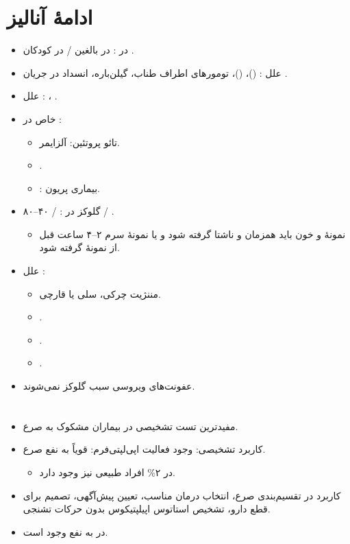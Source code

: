 \documentclass[a4paper,12pt]{extbook}
\begin{document}
\section*{ادامهٔ آنالیز }
\begin{itemize}
\item {} در : در بالغین  / در کودکان .
\item علل :  ()،  ()، تومورهای اطراف طناب، گیلن‌باره، انسداد در جریان .
\item علل : ، .
\item {} خاص در :
  \begin{itemize}
  \item تائو پروتئین: آلزایمر.
  \item {}.
  \item {}: بیماری پریون.
  \end{itemize}
\item گلوکز در :  / ۴۰–۸۰ / .
  \begin{itemize}
  \item نمونهٔ  و خون باید همزمان و ناشتا گرفته شود و یا نمونهٔ سرم ۲–۴ ساعت قبل از نمونهٔ  گرفته شود.
  \end{itemize}
\item علل :
  \begin{itemize}
  \item مننژیت چرکی، سلی یا قارچی.
  \item {}.
  \item {}.
  \item {}.
  \end{itemize}
\item عفونت‌های ویروسی سبب \PCmath{\downarrow} گلوکز نمی‌شوند.
\end{itemize}

\section*{}
\begin{itemize}
\item مفیدترین تست تشخیصی در بیماران مشکوک به صرع.
\item کاربرد تشخیصی: وجود فعالیت اپی‌لپتی‌فرم: قویاً به نفع صرع.
  \begin{itemize}
  \item در ۲\% افراد طبیعی نیز وجود دارد.
  \end{itemize}
\item کاربرد در تقسیم‌بندی صرع، انتخاب درمان مناسب، تعیین پیش‌آگهی، تصمیم برای قطع دارو، تشخیص استاتوس اپیلپتیکوس بدون حرکات تشنجی.
\item {} در  به نفع وجود  است.
\end{itemize}
\end{document}

